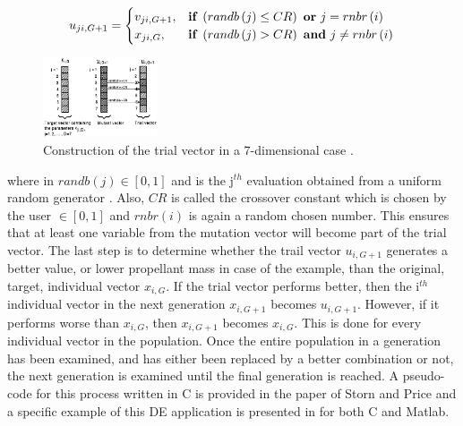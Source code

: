 \begin{equation} \label{eq:trial vector}
u_{ji,G+1}=\begin{cases}
v_{ji,G+1}, & \textbf{if}\ \left(randb\left(j\right)\leq CR \right) \ \textbf{or}\ j=rnbr\left(i\right)\\
x_{ji,G}, & \textbf{if}\ \left(randb\left(j\right)>CR \right) \ \textbf{and}\ j\neq rnbr\left(i\right)
\end{cases}\\
\end{equation}



\begin{figure}[!ht]
\centering
\includegraphics[width=0.3\textwidth]{figures/optimisation/trial_vec_storn1997differential.jpg}
\caption{Construction of the trial vector in a 7-dimensional case \cite{storn1997differential}.}
\label{fig:trial_vec_storn1997differential}
\end{figure}

\noindent where in  $randb\left(j\right)\in \left[0,1\right]$ and is the j$^{th}$ evaluation obtained from a  uniform random generator \cite{storn1997differential}. Also, $CR$ is called the crossover constant which is chosen by the user $\in \left[0,1\right]$ and $rnbr\left(i\right)$ is again a random chosen number. This ensures that at least one variable from the mutation vector will become part of the trial vector. The last step is to determine whether the trail vector $u_{i,G+1}$ generates a better value, or lower propellant mass in case of the example, than the original, target, individual vector $x_{i,G}$. If the trial vector performs better, then the i$^{th}$ individual vector in the next generation $x_{i,G+1}$ becomes $u_{i,G+1}$. However, if it performs worse than $x_{i,G}$, then $x_{i,G+1}$ becomes $x_{i,G}$. This is done for every individual vector in the population. Once the entire population in a generation has been examined, and has either been replaced by a better combination or not, the next generation is examined until the final generation is reached.
A pseudo-code for this process written in C is provided in the paper of Storn and Price \cite{storn1997differential} and a specific example of this \ac{DE} application is presented in \cite{feoktistov2006differential} for both C and Matlab.  

